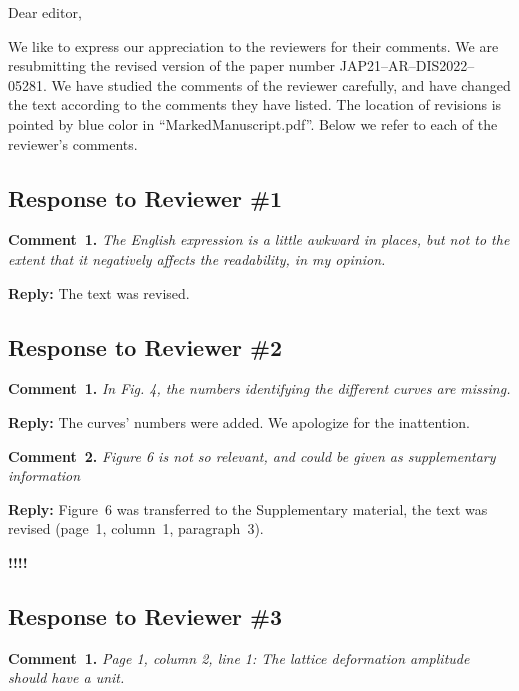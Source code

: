 \documentclass[aip,jap,preprint]{revtex4-1}
\begin{document}
Dear editor,

We like to express our appreciation to the reviewers for their comments.
We are resubmitting the revised version of the paper number JAP21--AR--DIS2022--05281.
We have studied the comments of the reviewer carefully, and have changed the text according to the comments they
have listed.
The location of revisions is pointed by blue color in ``MarkedManuscript.pdf''.
Below we refer to each of the reviewer’s comments.


\subsection*{Response to Reviewer \#1 }

\noindent
\textcolor[rgb]{0.00,0.50,1.00}{\textbf{Comment~1.}}
\emph{The English expression is a little awkward in places, but not to the extent that it negatively affects the readability, in my opinion.}

\noindent
\textcolor[rgb]{0.51,0.00,0.00}{\textbf{Reply:}}
The text was revised.


\subsection*{Response to Reviewer \#2 }

\noindent
\textcolor[rgb]{0.00,0.50,1.00}{\textbf{Comment~1.}}
\emph{In Fig. 4, the numbers identifying the different curves are missing.}

\noindent
\textcolor[rgb]{0.51,0.00,0.00}{\textbf{Reply:}}
The curves' numbers were added.
We apologize for the inattention.


\vspace{1cm}
\noindent
\textcolor[rgb]{0.00,0.50,1.00}{\textbf{Comment~2.}}
\emph{Figure 6 is not so relevant, and could be given as supplementary information}

\noindent
\textcolor[rgb]{0.51,0.00,0.00}{\textbf{Reply:}}
Figure~6 was transferred to the Supplementary material,
the text was revised (page~1, column~1, paragraph~3).

\textcolor[rgb]{1.00,0.00,0.00}{\textbf{!!!!}}

\subsection*{Response to Reviewer \#3 }

\noindent
\textcolor[rgb]{0.00,0.50,1.00}{\textbf{Comment~1.}}
\emph{Page 1, column 2, line 1: The lattice deformation amplitude should have a unit.}
\end{document}
